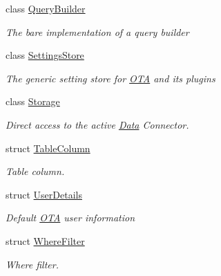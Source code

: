 \begin{DoxyCompactItemize}
class \hyperlink{classOTA_1_1Data_1_1QueryBuilder}{Query\+Builder}
\begin{DoxyCompactList}\small\item\em The bare implementation of a query builder \end{DoxyCompactList}\item 
class \hyperlink{classOTA_1_1Data_1_1SettingsStore}{Settings\+Store}
\begin{DoxyCompactList}\small\item\em The generic setting store for \hyperlink{namespaceOTA}{O\+T\+A} and its plugins \end{DoxyCompactList}\item 
class \hyperlink{classOTA_1_1Data_1_1Storage}{Storage}
\begin{DoxyCompactList}\small\item\em Direct access to the active \hyperlink{namespaceOTA_1_1Data}{Data} Connector. \end{DoxyCompactList}\item 
struct \hyperlink{structOTA_1_1Data_1_1TableColumn}{Table\+Column}
\begin{DoxyCompactList}\small\item\em Table column. \end{DoxyCompactList}\item 
struct \hyperlink{structOTA_1_1Data_1_1UserDetails}{User\+Details}
\begin{DoxyCompactList}\small\item\em Default \hyperlink{namespaceOTA}{O\+T\+A} user information \end{DoxyCompactList}\item 
struct \hyperlink{structOTA_1_1Data_1_1WhereFilter}{Where\+Filter}
\begin{DoxyCompactList}\small\item\em Where filter. \end{DoxyCompactList}\end{DoxyCompactItemize}
